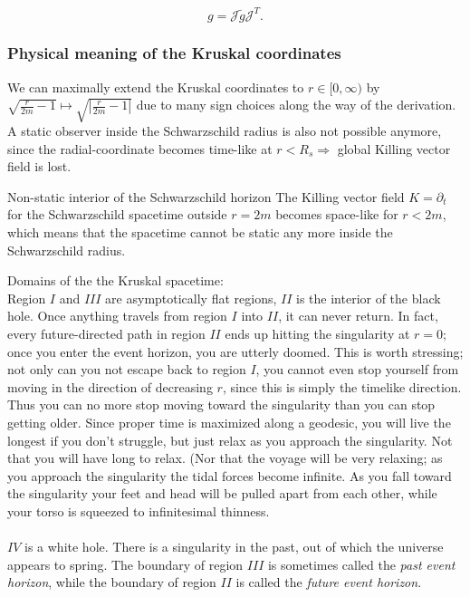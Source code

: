 \begin{equation}
	g = \mathcal{J} \tilde{g} \mathcal{J}^T.
\end{equation}

\subsubsection{Physical meaning of the Kruskal coordinates}
We can maximally extend the Kruskal coordinates to $r \in [0,\infty)$ by $\sqrt{\frac{r}{2m} -1} \mapsto\sqrt{|\frac{r}{2m} -1|}$ due to many sign choices along the way of the derivation.\\
A static observer inside the Schwarzschild radius is also not possible anymore, since the radial-coordinate becomes time-like at $r<R_s \Rightarrow$ global Killing vector field is lost.\\
\begin{mybox}{Non-static interior of the Schwarzschild horizon}
	The Killing vector field $K=\partial_t$ for the Schwarzschild spacetime outside $r=2m$ becomes space-like for $r<2m$, which means that the spacetime cannot be static any more inside the Schwarzschild radius.
\end{mybox}
Domains of the the Kruskal spacetime:\\
Region $I$ and $III$ are asymptotically flat regions, $II$ is the interior of the black hole. Once
anything travels from region $I$ into $II$, it can never return. In fact, every future-directed path
in region $II$ ends up hitting the singularity at $r = 0$; once you enter the event horizon, you are
utterly doomed. This is worth stressing; not only can you not escape back to region $I$, you
cannot even stop yourself from moving in the direction of decreasing $r$, since this is simply
the timelike direction. Thus you can no more stop moving
toward the singularity than you can stop getting older. Since proper time is maximized along
a geodesic, you will live the longest if you don’t struggle, but just relax as you approach
the singularity. Not that you will have long to relax. (Nor that the voyage will be very
relaxing; as you approach the singularity the tidal forces become infinite. As you fall toward
the singularity your feet and head will be pulled apart from each other, while your torso
is squeezed to infinitesimal thinness. \\
\\
$IV$ is a white hole.
There is a singularity in the past, out of which
the universe appears to spring. The boundary of region $III$ is sometimes called the \emph{past event horizon}, while the boundary of region $II$ is called the \emph{future event horizon}.\\

